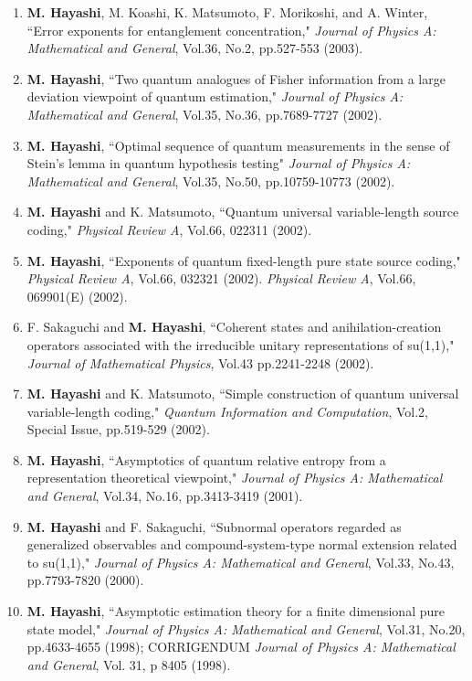 \documentclass[a4paper,12pt,oneside]{article}
\begin{document}
\begin{enumerate}
\item
\textbf{M. Hayashi}, M. Koashi, K. Matsumoto, F. Morikoshi, and A. Winter, 
``Error exponents for entanglement concentration," 
{\em Journal of Physics A: Mathematical and General}, Vol.36, No.2, pp.527-553 (2003). 

\item
\textbf{M. Hayashi}, ``Two quantum analogues of Fisher information from a large deviation viewpoint of quantum estimation," 
{\em Journal of Physics A: Mathematical and General}, Vol.35, No.36, pp.7689-7727 (2002).

\item
\textbf{M. Hayashi}, ``Optimal sequence of quantum measurements in the sense of Stein's lemma in quantum hypothesis testing" 
{\em Journal of Physics A: Mathematical and General}, Vol.35, No.50, pp.10759-10773 (2002).

\item
\textbf{M. Hayashi} and K. Matsumoto, ``Quantum universal variable-length source coding," 
{\em Physical Review A}, Vol.66, 022311 (2002). 

\item
\textbf{M. Hayashi}, ``Exponents of quantum fixed-length pure state source coding," 
{\em Physical Review A}, Vol.66, 032321 (2002). 
{\em Physical Review A}, Vol.66, 069901(E) (2002).

\item
F. Sakaguchi and \textbf{M. Hayashi}, ``Coherent states and anihilation-creation operators associated with the irreducible unitary representations of su(1,1)," 
{\em Journal of Mathematical Physics}, Vol.43 pp.2241-2248 (2002).

\item
\textbf{M. Hayashi} and K. Matsumoto, ``Simple construction of quantum universal variable-length coding," 
{\em Quantum Information and Computation}, Vol.2, Special Issue, pp.519-529 (2002).

\item
\textbf{M. Hayashi}, ``Asymptotics of quantum relative entropy from a representation theoretical viewpoint," 
{\em Journal of Physics A: Mathematical and General}, Vol.34, No.16, pp.3413-3419 (2001).

\item
\textbf{M. Hayashi} and F. Sakaguchi, ``Subnormal operators regarded as generalized observables and compound-system-type normal extension related to su(1,1)," 
{\em Journal of Physics A: Mathematical and General}, Vol.33, No.43, pp.7793-7820 (2000).

\item
\textbf{M. Hayashi}, ``Asymptotic estimation theory for a finite dimensional pure state model," 
{\em Journal of Physics A: Mathematical and General}, Vol.31, No.20, pp.4633-4655 (1998); 
CORRIGENDUM {\em Journal of Physics A: Mathematical and General}, Vol. 31, p 8405 (1998).
\end{enumerate}
\end{document}
